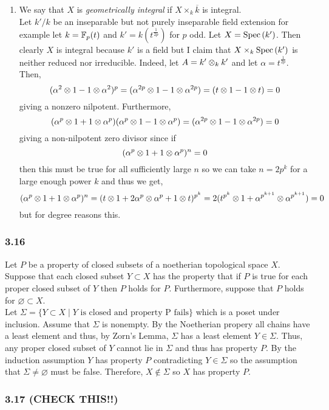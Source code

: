 \documentclass[12pt]{article}
\begin{document}
\begin{enumerate}
\item We say that $X$ is \textit{geometrically integral} if $X \times_k \overline{k}$ is integral. 
\bigskip\\
Let $k'/k$ be an inseparable but not purely inseparable field extension for example let $k = \mathbb{F}_p(t)$ and $k' = k(t^{\frac{1}{2p}})$ for $p$ odd. Let $X = \mathrm{Spec}\left( k' \right)$. Then clearly $X$ is integral because $k'$ is a field but I claim that $X \times_k \mathrm{Spec}\left( k' \right)$ is neither reduced nor irreducible. Indeed, let $A = k' \otimes_k k'$ and let $\alpha = t^{\frac{1}{2p}}$. Then,
\[ (\alpha^2 \otimes 1 - 1 \otimes \alpha^2)^p = (\alpha^{2p} \otimes 1 - 1 \otimes \alpha^{2p}) = (t \otimes 1 - 1 \otimes t) = 0 \]
giving a nonzero nilpotent. Furthermore,
\[ (\alpha^p \otimes 1 + 1 \otimes \alpha^p)(\alpha^p \otimes 1 - 1 \otimes \alpha^p) = (\alpha^{2p} \otimes 1 - 1 \otimes \alpha^{2p}) = 0  \]
giving a non-nilpotent zero divisor since if
\[ (\alpha^p \otimes 1 + 1 \otimes \alpha^p)^n = 0 \]
then this must be true for all sufficiently large $n$ so we can take $n = 2 p^k$ for a large enough power $k$ and thus we get,
\[ (\alpha^p \otimes 1 + 1 \otimes \alpha^p)^n = (t \otimes 1 + 2 \alpha^p \otimes \alpha^p + 1 \otimes t)^{p^k} = 2(t^{p^k} \otimes 1 + \alpha^{p^{k+1}} \otimes \alpha^{p^{k+1}}) = 0 \] 
but for degree reasons this.
\end{enumerate}

\subsubsection{3.16}

Let $P$ be a property of closed subsets of a noetherian topological space $X$. Suppose that each closed subset $Y \subset X$ has the property that if $P$ is true for each proper closed subset of $Y$ then $P$ holds for $P$. Furthermore, suppose that $P$ holds for $\varnothing \subset X$.
\bigskip\\
Let $\Sigma = \{ Y \subset X \mid Y \text{ is closed and property P fails} \}$ which is a poset under inclusion. Assume that $\Sigma$ is nonempty. By the Noetherian propery all chains have a least element and thus, by Zorn's Lemma, $\Sigma$ has a least element $Y \in \Sigma$. Thus, any proper closed subset of $Y$ cannot lie in $\Sigma$ and thus has property $P$. By the induction assumption $Y$ has property $P$ contradicting $Y \in \Sigma$ so the assumption that $\Sigma \neq \varnothing$ must be false. Therefore, $X \notin \Sigma$ so $X$ has property $P$.

\subsubsection{3.17 (CHECK THIS!!)}
\end{document}
